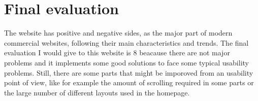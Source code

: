 \section{Final evaluation}
The website has positive and negative sides, as the major part of modern commercial websites, 
following their main characteristics and trends. 
The final evaluation I would give to this website is 8 beacause there are not major problems and 
it implements some good solutions to face some typical usability problems. Still, there are some 
parts that might be imporoved from an usability point of view, like for example the amount of scrolling
required in some parts or the large number of different layouts used in the homepage.
